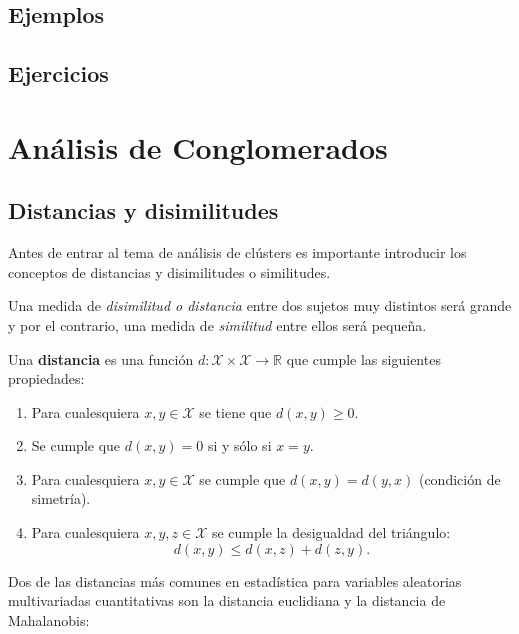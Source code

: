 \documentclass[
]{book}
\begin{document}
\section{Ejemplos}\label{ejemplos-1}

\section{Ejercicios}\label{ejercicios-5}

\chapter{Análisis de Conglomerados}\label{anuxe1lisis-de-conglomerados}

\section{Distancias y disimilitudes}\label{distancias-y-disimilitudes}

Antes de entrar al tema de análisis de clústers es importante introducir los conceptos de distancias y disimilitudes o similitudes.

Una medida de \emph{disimilitud o distancia} entre dos sujetos muy distintos será grande y por el contrario, una medida de \emph{similitud} entre ellos será pequeña.

Una \textbf{distancia} es una función \(d: \mathcal{X}\times \mathcal{X}\to \mathbb{R}\) que cumple las siguientes propiedades:

\begin{enumerate}
\def\labelenumi{\arabic{enumi})}
\item
  Para cualesquiera \(x,y\in\mathcal{X}\) se tiene que \(d(x,y)\geq 0\).
\item
  Se cumple que \(d(x,y)=0\) si y sólo si \(x=y\).
\item
  Para cualesquiera \(x,y\in\mathcal{X}\) se cumple que \(d(x,y) = d(y,x)\) (condición de simetría).
\item
  Para cualesquiera \(x,y,z\in\mathcal{X}\) se cumple la desigualdad del triángulo:
  \[
         d(x,y)\leq d(x,z) + d(z,y).
    \]
\end{enumerate}

Dos de las distancias más comunes en estadística para variables aleatorias multivariadas cuantitativas son la distancia euclidiana y la distancia de Mahalanobis:
\end{document}
